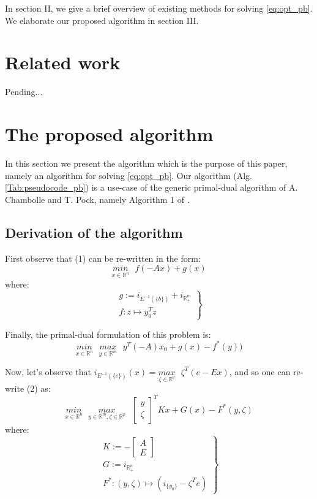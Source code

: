 \documentclass[a4paper,10pt,journal]{IEEEtran}
\begin{document}
In section II, we give a brief overview of existing methods for solving \eqref{eq:opt_pb}. We elaborate our proposed algorithm in section III.

\section{Related work}
Pending...

\section{The proposed algorithm}
\label{sec:algo}
In this section we present the algorithm which is the purpose of this paper, namely an algorithm for solving \eqref{eq:opt_pb}. Our algorithm (Alg.\ref{Tab:pseudocode_pb}) is a use-case of the generic primal-dual algorithm of A. Chambolle and T. Pock, namely Algorithm 1 of \cite{chambolle2010}.

\subsection{Derivation of the algorithm}
First observe that (1) can be re-written in the form:
\begin{equation}
  \underset{x \in \mathbb{R}^n}{min}\text{ }{f(-Ax) + g(x)}
\end{equation}
where:\\
\begin{equation}
  \left.
  \begin{aligned}
    g := i_{E^{-1}(\{b\})} + i_{\mathbb{R}_{+}^m}\\
    f: z \mapsto y_0^Tz
    \end{aligned}
  \right\}
\end{equation}

Finally, the primal-dual formulation of this problem is:
\begin{equation}
  \underset{x \in \mathbb{R}^n}{min}\text{ }\underset{y \in \mathbb{R}^m}{max}\text{ }{y^T(-A)x_0 + g(x) - f^*(y))}
\end{equation}

Now, let's observe that $i_{E^{-1}(\{e\})}(x) = \underset{\zeta \in \mathbb{R}^q}{max}\text{ }\zeta^T(e - Ex)$, and so one can re-write (2) as:
\begin{equation}
  \underset{x \in \mathbb{R}^n}{min}\text{ }\underset{y \in \mathbb{R}^m, \zeta \in \mathbb{R}^p}{max}\text{ }
  \begin{bmatrix}y\\\zeta\end{bmatrix}^TKx + G(x) - F^*(y, \zeta)
  \label{eq:pd_opt}
\end{equation}
where:
\begin{equation}
  \left.
  \begin{aligned}
    K := -\begin{bmatrix}A\\E\end{bmatrix}\\
    G := i_{\mathbb{R}_{+}^n}\\
    F^*: (y, \zeta) \mapsto (i_{\{y_0\}} - \zeta^Te)
  \end{aligned}
  \right\}
\end{equation}
\end{document}
